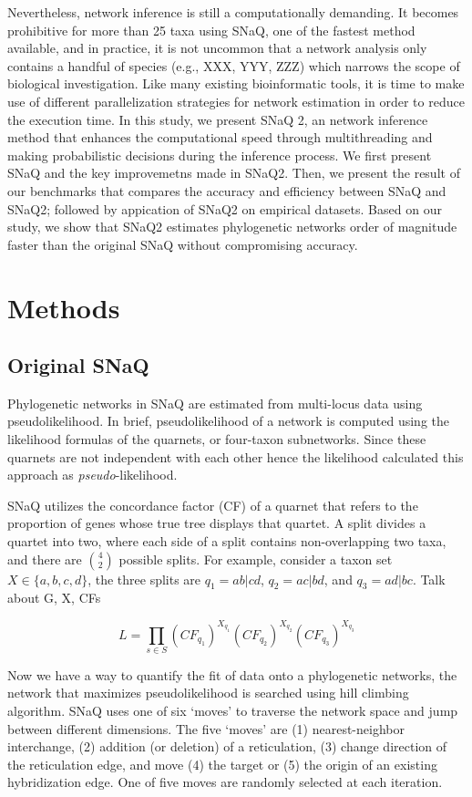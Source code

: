 \documentclass[unnumsec,webpdf,contemporary,large]{oup-authoring-template}%
\theoremstyle{thmstyleone}%
\theoremstyle{thmstyletwo}%
\theoremstyle{thmstylethree}%
\begin{document}
Nevertheless, network inference is still a computationally demanding. It becomes prohibitive for more than 25 taxa using SNaQ, one of the fastest method available, and in practice, it is not uncommon that a network analysis only contains a handful of species (e.g., XXX, YYY, ZZZ) which narrows the scope of biological investigation. Like many existing bioinformatic tools, it is time to make use of different parallelization strategies for network estimation in order to reduce the execution time. In this study, we present SNaQ 2, an network inference method that enhances the computational speed through multithreading and making probabilistic decisions during the inference process. We first present SNaQ and the key improvemetns made in SNaQ2. Then, we present the result of our benchmarks that compares the accuracy and efficiency between SNaQ and SNaQ2; followed by appication of SNaQ2 on empirical datasets. Based on our study, we show that SNaQ2 estimates phylogenetic networks order of magnitude faster than the original SNaQ without compromising accuracy.

\section{Methods}\label{sec2}
\subsection{Original SNaQ}\label{subsec1}
Phylogenetic networks in SNaQ are estimated from multi-locus data using pseudolikelihood. In brief, pseudolikelihood of a network is computed using the likelihood formulas of the quarnets, or four-taxon subnetworks. Since these quarnets are not independent with each other hence the likelihood calculated this approach as \textit{pseudo}-likelihood.

SNaQ utilizes the concordance factor (CF) of a quarnet that refers to the proportion of genes whose true tree displays that quartet. A split divides a quartet into two, where each side of a split contains non-overlapping two taxa, and there are $4 \choose 2$ possible splits. For example, consider a taxon set $X \in \{a,b,c,d\}$, the three splits are $q_1=ab|cd$, $q_2=ac|bd$, and $q_3=ad|bc$. Talk about G, X, CFs

\begin{equation}
    L=\prod_{s \in S}(CF_{q_1})^{X_{q_1}}(CF_{q_2})^{X_{q_2}}(CF_{q_3})^{X_{q_3}}
\end{equation}

Now we have a way to quantify the fit of data onto a phylogenetic networks, the network that maximizes pseudolikelihood is searched using hill climbing algorithm. SNaQ uses one of six `moves' to traverse the network space and jump between different dimensions. The five `moves' are (1) nearest-neighbor interchange, (2) addition (or deletion) of a reticulation, (3) change direction of the reticulation edge, and move (4) the target or (5) the origin of an existing hybridization edge. One of five moves are randomly selected at each iteration.
\end{document}
